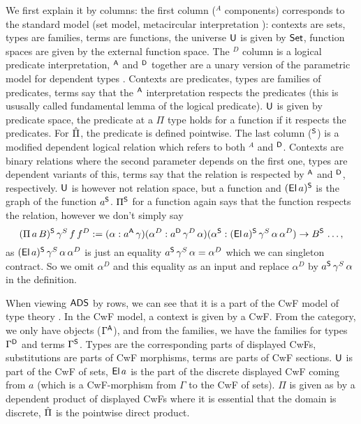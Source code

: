 \documentclass[a4paper,UKenglish,cleveref, autoref]{lipics-v2019}
\begin{document}
We first explain it by columns: the first column ($^A$ components)
corresponds to the standard model (set model, metacircular
interpretation \cite{ttintt}): contexts are sets, types are families,
terms are functions, the universe $\U$ is given by $\Set$, function
spaces are given by the external function space. The $^D$ column is a
logical predicate interpretation, $^\A$ and $^\D$ together are a unary
version of the parametric model for dependent types
\cite{10.1145/2535838.2535852}. Contexts are predicates, types are
families of predicates, terms say that the $^\A$ interpretation
respects the predicates (this is ususally called fundamental lemma of
the logical predicate). $\U$ is given by predicate space, the
predicate at a $\Pi$ type holds for a function if it respects the
predicates. For $\Pim$, the predicate is defined pointwise. The last
column ($^\S$) is a modified dependent logical relation which refers
to both $^A$ and $^\D$. Contexts are binary relations where the second
parameter depends on the first one, types are dependent variants of
this, terms say that the relation is respected by $^\A$ and $^\D$,
respectively. $\U$ is however not relation space, but a function and
$(\El\,a)^\S$ is the graph of the function $a^\S$. $\Pi^\S$ for a
function again says that the function respects the relation, however
we don't simply say
\[
  (\Pi\,a\,B)^\S\,\gamma^S\,f\,f^D := (\alpha:a^\A\,\gamma)(\alpha^D:a^\D\,\gamma^D\,\alpha)(\alpha^\S:(\El\,a)^\S\,\gamma^S\,\alpha\,\alpha^D)\ra B^\S\,\dots,
\]
as $(\El\,a)^\S\,\gamma^S\,\alpha\,\alpha^D$ is just an equality
$a^\S\,\gamma^S\,\alpha = \alpha^D$ which we can singleton
contract. So we omit $\alpha^D$ and this equality as an input and
replace $\alpha^D$ by $a^\S\,\gamma^S\,\alpha$ in the definition.

When viewing $\ADS$ by rows, we can see that it is a part of the CwF
model of type theory \cite[Section
7.4]{Kaposi:2019:CQI:3302515.3290315}. In the CwF model, a context is
given by a CwF. From the category, we only have objects ($\Gamma^\A$),
and from the families, we have the families for types $\Gamma^\D$ and
terms $\Gamma^\S$. Types are the corresponding parts of displayed
CwFs, substitutions are parts of CwF morphisms, terms are parts of CwF
sections. $\U$ is part of the CwF of sets, $\El\,a$ is the part of the
discrete displayed CwF coming from $a$ (which is a CwF-morphism from
$\Gamma$ to the CwF of sets). $\Pi$ is given as by a dependent product
of displayed CwFs where it is essential that the domain is discrete,
$\Pim$ is the pointwise direct product.
\end{document}
